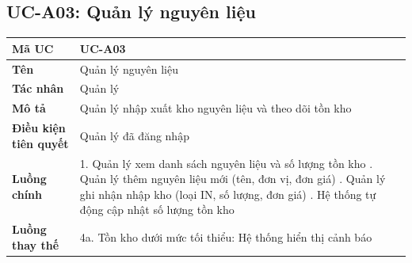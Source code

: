 \documentclass[../20232006p.tex]{subfiles}
\begin{document}
\subsection{UC-A03: Quản lý nguyên liệu}
\begin{table}[H]
    \centering
    \begin{tabular}{|p{3.5cm}|p{10cm}|}
        \hline
        \textbf{Mã UC}                & UC-A03                                                \\
        \hline
        \textbf{Tên}                  & Quản lý nguyên liệu                                   \\
        \hline
        \textbf{Tác nhân}             & Quản lý                                               \\
        \hline
        \textbf{Mô tả}                & Quản lý nhập xuất kho nguyên liệu và theo dõi tồn kho \\
        \hline
        \textbf{Điều kiện tiên quyết} & Quản lý đã đăng nhập                                  \\
        \hline
        \textbf{Luồng chính}          &
        1. Quản lý xem danh sách nguyên liệu và số lượng tồn kho \newline
        2. Quản lý thêm nguyên liệu mới (tên, đơn vị, đơn giá) \newline
        3. Quản lý ghi nhận nhập kho (loại IN, số lượng, đơn giá) \newline
        4. Hệ thống tự động cập nhật số lượng tồn kho                                         \\
        \hline
        \textbf{Luồng thay thế}       &
        4a. Tồn kho dưới mức tối thiểu: Hệ thống hiển thị cảnh báo                            \\
        \hline
    \end{tabular}
\end{table}
\end{document}
